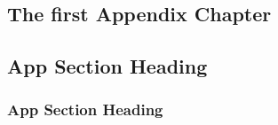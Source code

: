 \documentclass[
DToption=dissertation,%
wsudraft,
]{wsu}
\begin{document}
\begin{appendices}\appendicestocpagenum

\chapter{The first Appendix Chapter}
\lipsum[1-5]

\section{App Section Heading}

\subsection{App Section Heading}



\end{appendices}
\clearpage

\renewcommand{\bibname}{\large\bfseries\MakeUppercase{Bibliography}}
\let\WriteBookmarks\relax
{}


\clearpage

\layout
\end{document}
